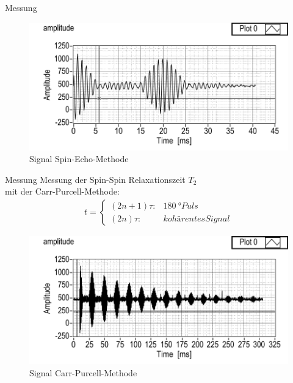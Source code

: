 \begin{frame}{Messung}
	\begin{figure}
	\centering
	\includegraphics[scale=.8]{images//pulse.png}
	\caption{Signal Spin-Echo-Methode \cite{script_nmr}}
	\end{figure}
\end{frame}

\begin{frame}{Messung}
Messung der Spin-Spin Relaxationszeit $T_2$\\mit der Carr-Purcell-Methode:
	\begin{align*}
	t =\begin{cases*} (2n+1)\tau: & \SI{180}{\degree} Puls \\ (2n)\tau: & kohärentes Signal \end{cases*}
	\end{align*}
	\begin{figure}
	\centering
	\includegraphics[scale=.65]{images//carrpurcell.png}
	\caption{Signal Carr-Purcell-Methode \cite{script_nmr}}
	\end{figure}
\end{frame}

